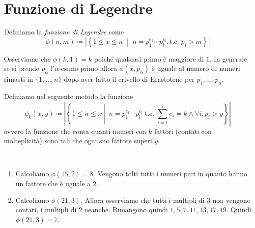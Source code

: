 
\chapter{Funzione di Legendre}

\begin{definizione}
	Definiamo la \emph{funzione di Legendre} come 
	\begin{equation*}
      \phi(n,m) \coloneqq \left|\left\{ 1 \le x \le n \; 
        \middle|\; n = p^{e_1}_1 \cdots p^{e_l}_l, \text{t.c.}\;
            p_i > m \right\}\right|
	\end{equation*} 
\end{definizione}

\begin{osservazione}
  Osserviamo che $\phi(k,1) = k$ poiché qualsiasi primo è maggiore di $1$. 
  In generale se si prende $p_\alpha$ l'$\alpha$-esimo primo allora 
  $\phi(x,p_\alpha)$ è uguale al numero di numeri rimasti in $\{1,\dots, n\}$ 
  dopo aver fatto il crivello di Erastotene per $p_1, \dots, p_{\alpha}$.
\end{osservazione}

\begin{definizione}
  Definiamo nel seguente metodo la funzione 
  \begin{equation*}
    \phi_k(x,y) \coloneqq \left|\left\{ 1 \le n \le x \middle|\, 
            n = p^{e_1}_1\cdots p^{e_l}_l \;\text{t.c.}\; 
          \sum_{i=1}^l e_i = k \land \forall i. \, p_i > y \right\}\right|
  \end{equation*}
  ovvero la funzione che conta quanti numeri con $k$ fattori (contati con
  molteplicità) sono tali che ogni suo fattore superi $y$.
\end{definizione}

\begin{esempio}\
  \begin{enumerate}
    \item Calcoliamo $\phi(15,2) = 8$. Vengono tolti tutti
      i numeri pari in quanto hanno un fattore che è uguale a $2$.
    \item Calcoliamo $\phi(21,3)$. Allora osserviamo che tutti i multipli di
      $3$ non vengono contati, i multipli di $2$ neanche. Rimangono quindi
      $1,5,7,11,13,17,19$. Quindi $\phi(21,3) = 7$.
  \end{enumerate}
\end{esempio}

